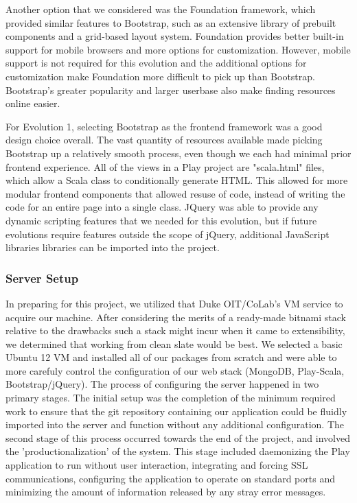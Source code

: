 \documentclass{article}
\begin{document}
Another option that we considered was the Foundation framework, which provided similar features to Bootstrap, such as an extensive library of prebuilt components and a grid-based layout system. Foundation provides better built-in support for mobile browsers and more options for customization. However, mobile support is not required for this evolution and the additional options for customization make Foundation more difficult to pick up than Bootstrap. Bootstrap's greater popularity and larger userbase also make finding resources online easier.

For Evolution 1, selecting Bootstrap as the frontend framework was a good design choice overall. The vast quantity of resources available made picking Bootstrap up a relatively smooth process, even though we each had minimal prior frontend experience. All of the views in a Play project are "scala.html" files, which allow a Scala class to conditionally generate HTML. This allowed for more modular frontend components that allowed resuse of code, instead of writing the code for an entire page into a single class. JQuery was able to provide any dynamic scripting features that we needed for this evolution, but if future evolutions require features outside the scope of jQuery, additional JavaScript libraries libraries can be imported into the project.

\subsubsection{Server Setup}

In preparing for this project, we utilized that Duke OIT/CoLab's VM service to acquire our machine. After considering the merits of a ready-made bitnami stack relative to the drawbacks such a stack might incur when it came to extensibility, we determined that working from clean slate would be best. We selected a basic Ubuntu 12 VM and installed all of our packages from scratch and were able to more carefuly control the configuration of our web stack (MongoDB, Play-Scala, Bootstrap/jQuery). The process of configuring the server happened in two primary stages. The initial setup was the completion of the minimum required work to ensure that the git repository containing our application could be fluidly imported into the server and function without any additional configuration. The second stage of this process occurred towards the end of the project, and involved the 'productionalization' of the system. This stage included daemonizing the Play application to run without user interaction, integrating and forcing SSL communications, configuring the application to operate on standard ports and minimizing the amount of information released by any stray error messages.
\end{document}
